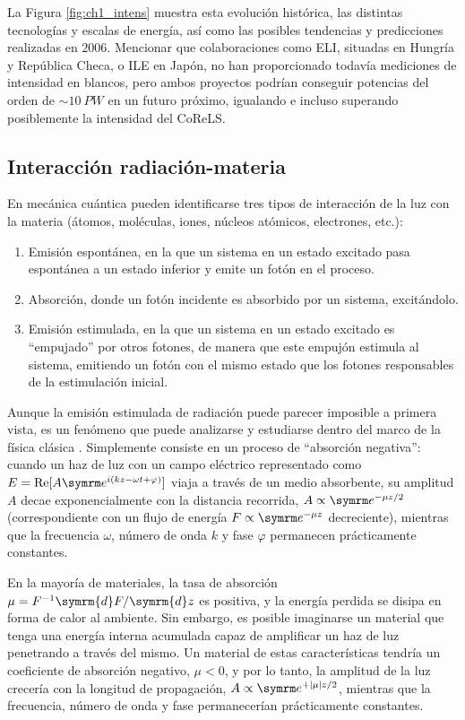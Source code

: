 La Figura \ref{fig:ch1_intens} muestra esta evolución histórica, las distintas tecnologías y escalas de energía, así como las posibles tendencias y predicciones \autocite{Mourou2006} realizadas en $2006$. Mencionar que colaboraciones como ELI, situadas en Hungría y República Checa, o ILE en Japón, no han proporcionado todavía mediciones de intensidad en blancos, pero ambos proyectos podrían conseguir potencias del orden de $\sim \qty{10}{PW}$ en un futuro próximo, igualando e incluso superando posiblemente la intensidad del CoReLS. 

\subsection{Interacción radiación-materia}\label{sec:1.1.1}
En mecánica cuántica pueden identificarse tres tipos de interacción de la luz con la materia (átomos, moléculas, iones, núcleos atómicos, electrones, etc.): 
\begin{enumerate}[label=(\roman*)]

    \item Emisión espontánea, en la que un sistema en un estado excitado pasa espontánea a un estado inferior y emite un fotón en el proceso.
    \item Absorción, donde un fotón incidente es absorbido por un sistema, excitándolo.
    \item Emisión estimulada, en la que un sistema en un estado excitado es \enquote{empujado} por otros fotones, de manera que este empujón estimula al sistema, emitiendo un fotón con el mismo estado que los fotones responsables de la estimulación inicial.

\end{enumerate}
Aunque la emisión estimulada de radiación puede parecer imposible a primera vista, es un fenómeno que puede analizarse y estudiarse dentro del marco de la física clásica \autocite{Thorne2017}. Simplemente consiste en un proceso de \enquote{absorción negativa}: cuando un haz de luz con un campo eléctrico representado como $E = \RE [A\eu^{i(kz - \omega t + \varphi)}]$ viaja a través de un medio absorbente, su amplitud $A$ decae exponencialmente con la distancia recorrida, $A \propto \eu^{-\mu z/2}$ (correspondiente con un flujo de energía $F \propto \eu^{-\mu z}$ decreciente), mientras que la frecuencia $\omega$, número de onda $k$ y fase $\varphi$ permanecen prácticamente constantes.

En la mayoría de materiales, la tasa de absorción $\mu = F^{-1} \symrm{d}F/\symrm{d}z$ es positiva, y la energía perdida se disipa en forma de calor al ambiente. Sin embargo, es posible imaginarse un material que tenga una energía interna acumulada capaz de amplificar un haz de luz penetrando a través del mismo. Un material de estas características tendría un coeficiente de absorción negativo, $\mu < 0$, y por lo tanto, la amplitud de la luz crecería con la longitud de propagación, $A \propto \eu^{+|\mu|z/2}$, mientras que la frecuencia, número de onda y fase permanecerían prácticamente constantes.

